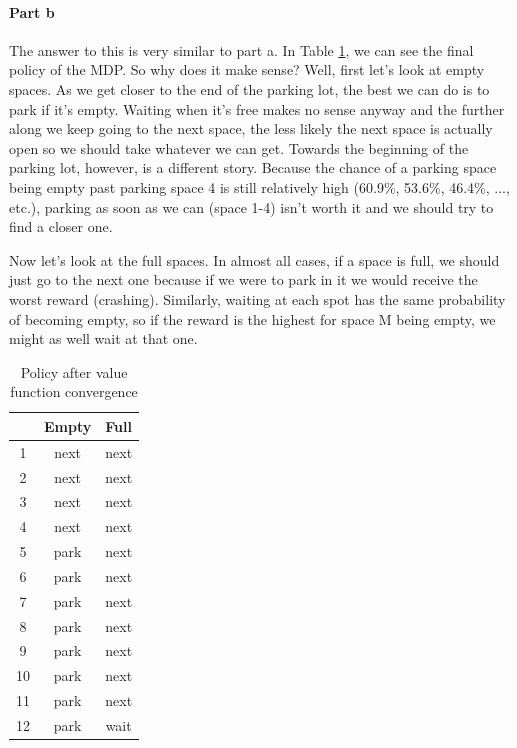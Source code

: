\documentclass[12pt]{article}
\begin{document}
\paragraph{Part b}
The answer to this is very similar to part a. In Table \ref{tab:policy}, we can see the final policy of the MDP. So why does it make sense? Well, first let's look at empty spaces. As we get closer to the end of the parking lot, the best we can do is to park if it's empty. Waiting when it's free makes no sense anyway and the further along we keep going to the next space, the less likely the next space is actually open so we should take whatever we can get. Towards the beginning of the parking lot, however, is a different story. Because the chance of a parking space being empty past parking space 4 is still relatively high (60.9\%, 53.6\%, 46.4\%, ..., etc.), parking as soon as we can (space 1-4) isn't worth it and we should try to find a closer one.

Now let's look at the full spaces. In almost all cases, if a space is full, we should just go to the next one because if we were to park in it we would receive the worst reward (crashing). Similarly, waiting at each spot has the same probability of becoming empty, so if the reward is the highest for space M being empty, we might as well wait at that one.


\begin{table}[]
  \centering
  \caption{Policy after value function convergence}
  \label{tab:policy}
  \begin{tabular}{|c|c|c|}
    \hline
       & Empty & Full \\ \hline
    1  & next  & next \\ \hline
    2  & next  & next \\ \hline
    3  & next  & next \\ \hline
    4  & next  & next \\ \hline
    5  & park  & next \\ \hline
    6  & park  & next \\ \hline
    7  & park  & next \\ \hline
    8  & park  & next \\ \hline
    9  & park  & next \\ \hline
    10 & park  & next \\ \hline
    11 & park  & next \\ \hline
    12 & park  & wait \\ \hline
  \end{tabular}
\end{table}
\end{document}
